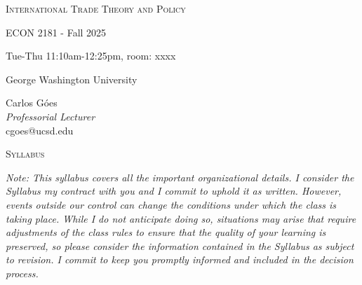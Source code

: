\documentclass[11pt]{article}
\begin{document}
	
	\textsc{   }
	\bigskip
	
	\begin{center}
		\Large{\textsc{International Trade Theory and Policy}}
		
		\Large{ECON 2181 - Fall 2025}
		
		\LARGE{Tue-Thu 11:10am-12:25pm, room: xxxx }
		
		\Large{George Washington University}
		
	
		
		
	\end{center}

	
\medskip
	
	\begin{center}
			Carlos Góes  \\
			\textit{Professorial Lecturer}\\
			cgoes@ucsd.edu\\
	\end{center}	
		\medskip
		
	\bigskip





\begin{center}
\Large{\textsc{Syllabus}} 
\end{center}

\bigskip

\noindent \textit{\noindent Note: This syllabus covers all the important organizational details. I consider the Syllabus my contract with you and I commit to uphold it as written. However,  events outside our control can change the conditions under which the class is taking place. While I do not anticipate doing so, situations may arise that require adjustments of the class rules to ensure that the quality of your learning is preserved, so please consider the information contained in the Syllabus as subject to revision. I commit to keep you promptly informed and included in the decision process.}
\bigskip
\end{document}
